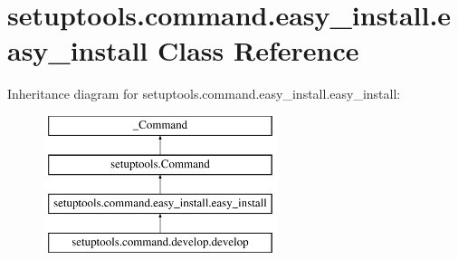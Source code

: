 \hypertarget{classsetuptools_1_1command_1_1easy__install_1_1easy__install}{}\section{setuptools.\+command.\+easy\+\_\+install.\+easy\+\_\+install Class Reference}
\label{classsetuptools_1_1command_1_1easy__install_1_1easy__install}
Inheritance diagram for setuptools.\+command.\+easy\+\_\+install.\+easy\+\_\+install\+:\begin{figure}[H]
\begin{center}
\leavevmode
\includegraphics[height=4.000000cm]{classsetuptools_1_1command_1_1easy__install_1_1easy__install}
\end{center}
\end{figure}
